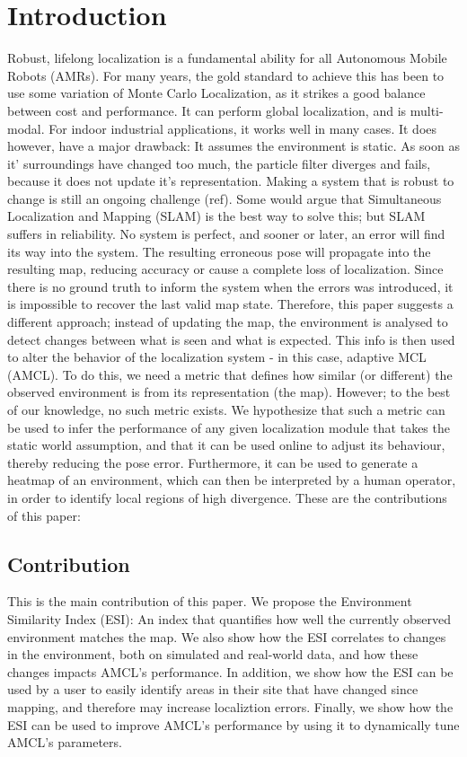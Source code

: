 \documentclass[conference]{IEEEtran}
\begin{document}
\section{Introduction}
Robust, lifelong localization is a fundamental ability for all Autonomous Mobile Robots (AMRs). For many years, the gold standard to achieve this has been to use some variation 
of Monte Carlo Localization, as it strikes a good balance between cost and performance. It can perform global localization, and is multi-modal. For indoor industrial applications, 
it works well in many cases. It does however, have a major drawback: It assumes the environment is static. As soon as it' surroundings have changed too much, the particle filter 
diverges and fails, because it does not update it's representation. Making a system that is robust to change is still an ongoing challenge (ref). Some would argue that 
Simultaneous Localization and Mapping (SLAM) is the best way to solve this; but SLAM suffers in reliability. No system is perfect, and sooner or later, an error will find its way 
into the system. The resulting erroneous pose will propagate into the resulting map, reducing accuracy or cause a complete loss of localization. Since there is no ground truth 
to inform the system when the errors was introduced, it is impossible to recover the last valid map state. Therefore, this paper suggests a different approach; instead of updating 
the map, the environment is analysed to detect changes between what is seen and what is expected. This info is then used to alter the behavior of the localization system 
- in this case, adaptive MCL (AMCL). To do this, we need a metric that defines how similar (or different) the observed environment is from its representation (the map). 
However; to the best of our knowledge, no such metric exists. We hypothesize that such a metric can be used to infer the performance of any given localization module that takes 
the static world assumption, and that it can be used online to adjust its behaviour, thereby reducing the pose error. Furthermore, it can be used to generate a heatmap of 
an environment, which can then be interpreted by a human operator, in order to identify local regions of high divergence. These are the contributions of this paper:

\subsection{Contribution}
This is the main contribution of this paper. We propose the Environment Similarity Index (ESI): An index that quantifies how well the currently observed environment matches the map.
We also show how the ESI correlates to changes in the environment, both on simulated and real-world data, and how these changes impacts AMCL's performance. 
In addition, we show how the ESI can be used by a user to easily identify areas in their site that have changed since mapping, and therefore may increase localiztion errors. 
Finally, we show how the ESI can be used to improve AMCL's performance by using it to dynamically tune AMCL's parameters.
\end{document}

